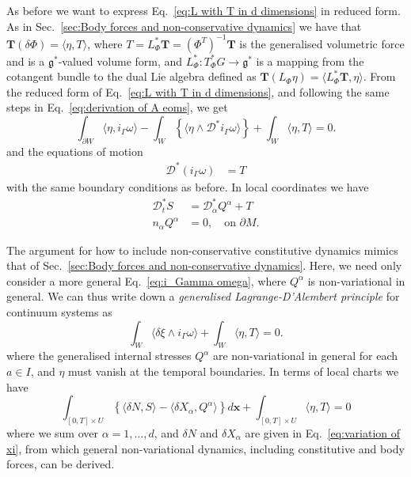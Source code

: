 As before we want to express Eq.~\ref{eq:L with T in d dimensions} in reduced form. As in Sec.~\ref{sec:Body forces and non-conservative dynamics} we have that $\mathbf{T}(\delta \Phi) = \langle \eta, T \rangle$, where $T = L^*_\Phi \mathbf{T} = (\Phi^T)^{-1} \mathbf{T}$ is the generalised volumetric force and is a $\mathfrak{g}^*$-valued volume form, and $L^*_\Phi : T^*_\Phi G \to \mathfrak{g}^*$ is a mapping from the cotangent bundle to the dual Lie algebra defined as $\mathbf{T}( L_\Phi \eta ) = \langle L^*_\Phi \mathbf{T}, \eta \rangle$. From the reduced form of Eq.~\ref{eq:L with T in d dimensions}, and following the same steps in Eq.~\ref{eq:derivation of A eoms}, we get
\begin{equation}
\int_{\partial W} \langle \eta, i_\Gamma \omega \rangle -
 \int_W \left\{ \langle \eta \wedge \mathcal{D}^* i_\Gamma \omega  \rangle \right\} + \int_W \langle \eta, T \rangle = 0.
\end{equation}
and the equations of motion
\begin{subequations}
\begin{align}
\mathcal{D}^* ( i_\Gamma \omega) & = T
\end{align}
\end{subequations}
with the same boundary conditions as before. In local coordinates we have
\begin{subequations} 
\begin{align}
\mathcal{D}^*_t S & = \mathcal{D}^*_\alpha Q^\alpha + T \\
n_\alpha Q^\alpha & = 0, \quad \text{on } \partial M.
\end{align}
\end{subequations}

The argument for how to include non-conservative constitutive dynamics mimics that of Sec.~\ref{sec:Body forces and non-conservative dynamics}. Here, we need only consider a more general Eq.~\ref{eq:i_Gamma omega}, where $Q^\alpha$ is non-variational in general. We can thus write down a \textit{generalised Lagrange-D'Alembert principle} for continuum systems as
\begin{equation}
\int_W \langle \delta \xi \wedge i_\Gamma \omega \rangle + \int_W \langle \eta, T \rangle = 0.
\end{equation}
where the generalised internal stresses $Q^\alpha$ are non-variational in general for each $a \in I$, and $\eta$ must vanish at the temporal boundaries. In terms of local charts we have
\begin{equation}
\int_{[0, T] \times U} \left\{ \langle \delta N, S \rangle - \langle \delta X_{\alpha}, Q^\alpha \rangle  \right\} d \mathbf{x} + \int_{[0, T] \times U} \langle \eta, T \rangle = 0
\end{equation}
where we sum over $\alpha = 1, \dots, d$, and $\delta N$ and $\delta X_{\alpha}$ are given in Eq.~\ref{eq:variation of xi}, from which general non-variational dynamics, including constitutive and body forces, can be derived.














